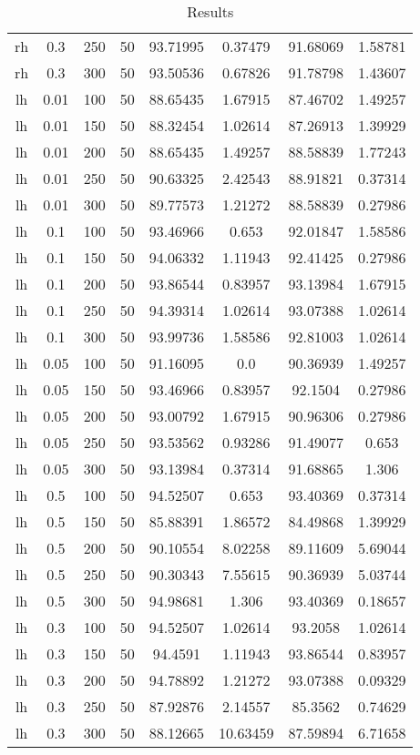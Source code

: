 \begin{table}[htbp]
\begin{tabular}{|c|c|c|c|c|c|c|c|}
rh & 0.3 & 250 & 50 & 93.71995 & 0.37479 & 91.68069 & 1.58781 \\
rh & 0.3 & 300 & 50 & 93.50536 & 0.67826 & 91.78798 & 1.43607 \\
lh & 0.01 & 100 & 50 & 88.65435 & 1.67915 & 87.46702 & 1.49257 \\
lh & 0.01 & 150 & 50 & 88.32454 & 1.02614 & 87.26913 & 1.39929 \\
lh & 0.01 & 200 & 50 & 88.65435 & 1.49257 & 88.58839 & 1.77243 \\
lh & 0.01 & 250 & 50 & 90.63325 & 2.42543 & 88.91821 & 0.37314 \\
lh & 0.01 & 300 & 50 & 89.77573 & 1.21272 & 88.58839 & 0.27986 \\
lh & 0.1 & 100 & 50 & 93.46966 & 0.653 & 92.01847 & 1.58586 \\
lh & 0.1 & 150 & 50 & 94.06332 & 1.11943 & 92.41425 & 0.27986 \\
lh & 0.1 & 200 & 50 & 93.86544 & 0.83957 & 93.13984 & 1.67915 \\
lh & 0.1 & 250 & 50 & 94.39314 & 1.02614 & 93.07388 & 1.02614 \\
lh & 0.1 & 300 & 50 & 93.99736 & 1.58586 & 92.81003 & 1.02614 \\
lh & 0.05 & 100 & 50 & 91.16095 & 0.0 & 90.36939 & 1.49257 \\
lh & 0.05 & 150 & 50 & 93.46966 & 0.83957 & 92.1504 & 0.27986 \\
lh & 0.05 & 200 & 50 & 93.00792 & 1.67915 & 90.96306 & 0.27986 \\
lh & 0.05 & 250 & 50 & 93.53562 & 0.93286 & 91.49077 & 0.653 \\
lh & 0.05 & 300 & 50 & 93.13984 & 0.37314 & 91.68865 & 1.306 \\
lh & 0.5 & 100 & 50 & 94.52507 & 0.653 & 93.40369 & 0.37314 \\
lh & 0.5 & 150 & 50 & 85.88391 & 1.86572 & 84.49868 & 1.39929 \\
lh & 0.5 & 200 & 50 & 90.10554 & 8.02258 & 89.11609 & 5.69044 \\
lh & 0.5 & 250 & 50 & 90.30343 & 7.55615 & 90.36939 & 5.03744 \\
lh & 0.5 & 300 & 50 & 94.98681 & 1.306 & 93.40369 & 0.18657 \\
lh & 0.3 & 100 & 50 & 94.52507 & 1.02614 & 93.2058 & 1.02614 \\
lh & 0.3 & 150 & 50 & 94.4591 & 1.11943 & 93.86544 & 0.83957 \\
lh & 0.3 & 200 & 50 & 94.78892 & 1.21272 & 93.07388 & 0.09329 \\
lh & 0.3 & 250 & 50 & 87.92876 & 2.14557 & 85.3562 & 0.74629 \\
lh & 0.3 & 300 & 50 & 88.12665 & 10.63459 & 87.59894 & 6.71658 \\
\hline
\end{tabular}
\caption{Results}
\label{tab:results}
\end{table}
